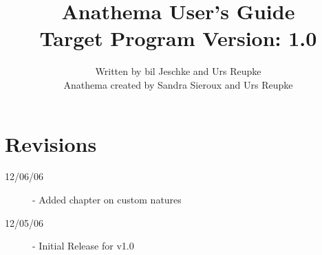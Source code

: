 \documentclass[]{report}
\title{Anathema User's Guide\\ Target Program Version: 1.0}
\author{Written by bil Jeschke and Urs Reupke \\ Anathema created by Sandra Sieroux and Urs Reupke}
\date{}
\begin{document}
\maketitle
\sffamily
{}
\tableofcontents
\pagebreak
\setcounter{page}{1}





\appendix


\chapter*{Revisions}
\begin{description}
\item[12/06/06] - Added chapter on custom natures
\item[12/05/06] - Initial Release for v1.0
\end{description}
\end{document}
